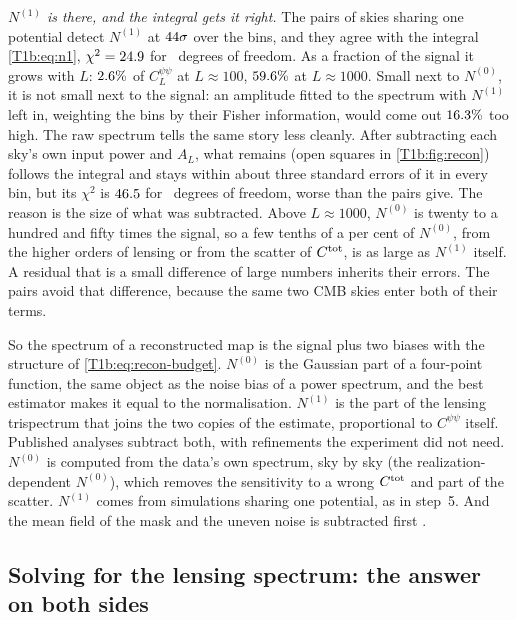 \emph{$N^{(1)}$ is there, and the integral gets it right.} The pairs of skies sharing one potential detect $N^{(1)}$ at $44\sigma$ over the bins, and they agree with the integral \eqref{T1b:eq:n1}, $\chi^2=24.9$ for \TOneRNbin\ degrees of freedom. As a fraction of the signal it grows with $L$: $2.6\%$ of $C^{\psi\psi}_L$ at $L\approx100$, $59.6\%$ at $L\approx1000$. Small next to $N^{(0)}$, it is not small next to the signal: an amplitude fitted to the spectrum with $N^{(1)}$ left in, weighting the bins by their Fisher information, would come out $16.3\%$ too high. The raw spectrum tells the same story less cleanly. After subtracting each sky's own input power and $A_L$, what remains (open squares in \cref{T1b:fig:recon}) follows the integral and stays within about three standard errors of it in every bin, but its $\chi^2$ is $46.5$ for \TOneRNbin\ degrees of freedom, worse than the pairs give. The reason is the size of what was subtracted. Above $L\approx1000$, $N^{(0)}$ is twenty to a hundred and fifty times the signal, so a few tenths of a per cent of $N^{(0)}$, from the higher orders of lensing or from the scatter of $C^{\rm tot}$, is as large as $N^{(1)}$ itself. A residual that is a small difference of large numbers inherits their errors. The pairs avoid that difference, because the same two CMB skies enter both of their terms.

So the spectrum of a reconstructed map is the signal plus two biases with the structure of \eqref{T1b:eq:recon-budget}. $N^{(0)}$ is the Gaussian part of a four-point function, the same object as the noise bias of a power spectrum, and the best estimator makes it equal to the normalisation. $N^{(1)}$ is the part of the lensing trispectrum that joins the two copies of the estimate, proportional to $C^{\psi\psi}$ itself. Published analyses subtract both, with refinements the experiment did not need. $N^{(0)}$ is computed from the data's own spectrum, sky by sky (the realization-dependent $N^{(0)}$), which removes the sensitivity to a wrong $C^{\rm tot}$ and part of the scatter. $N^{(1)}$ comes from simulations sharing one potential, as in step~5. And the mean field of the mask and the uneven noise is subtracted first \cite{Hanson2011,Namikawa2013,Planck2018VIII}.

\subsection{Solving for the lensing spectrum: the answer on both sides}
\label{T1b:sec:recon-solve}

